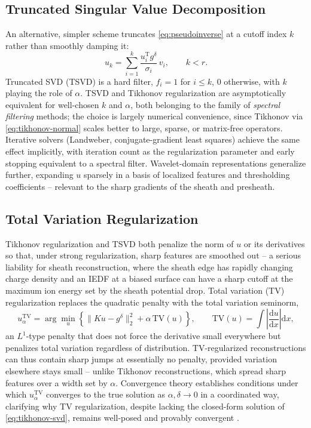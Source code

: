 \subsection{Truncated Singular Value Decomposition}

An alternative, simpler scheme truncates \cref{eq:pseudoinverse} at a cutoff index $k$ rather than smoothly damping it:
\begin{equation}
u_{k} = \sum_{i=1}^{k} \frac{u_{i}^{\mathrm{T}} g^{\delta}}{\sigma_{i}}\, v_{i}, \qquad k < r.
\label{eq:tsvd}
\end{equation}
Truncated SVD (TSVD) is a hard filter, $f_i = 1$ for $i \le k$, $0$ otherwise, with $k$ playing the role of $\alpha$. TSVD and Tikhonov regularization are asymptotically equivalent for well-chosen $k$ and $\alpha$, both belonging to the family of \emph{spectral filtering} methods; the choice is largely numerical convenience, since Tikhonov via \cref{eq:tikhonov-normal} scales better to large, sparse, or matrix-free operators. Iterative solvers (Landweber, conjugate-gradient least squares) achieve the same effect implicitly, with iteration count as the regularization parameter and early stopping equivalent to a spectral filter. Wavelet-domain representations generalize further, expanding $u$ sparsely in a basis of localized features and thresholding coefficients -- relevant to the sharp gradients of the sheath and presheath.

\subsection{Total Variation Regularization}

Tikhonov regularization and TSVD both penalize the norm of $u$ or its derivatives so that, under strong regularization, sharp features are smoothed out -- a serious liability for sheath reconstruction, where the sheath edge has rapidly changing charge density and an IEDF at a biased surface can have a sharp cutoff at the maximum ion energy set by the sheath potential drop. Total variation (TV) regularization replaces the quadratic penalty with the total variation seminorm,
\begin{equation}
u_{\alpha}^{\mathrm{TV}} = \arg\min_{u} \left\{ \| Ku - g^{\delta} \|_{2}^{2} + \alpha \, \mathrm{TV}(u) \right\}, \qquad \mathrm{TV}(u) = \int \left| \frac{\mathrm{d}u}{\mathrm{d}x} \right| \mathrm{d}x,
\label{eq:tv}
\end{equation}
an $L^1$-type penalty that does not force the derivative small everywhere but penalizes total variation regardless of distribution. TV-regularized reconstructions can thus contain sharp jumps at essentially no penalty, provided variation elsewhere stays small -- unlike Tikhonov reconstructions, which spread sharp features over a width set by $\alpha$. Convergence theory establishes conditions under which $u_{\alpha}^{\mathrm{TV}}$ converges to the true solution as $\alpha, \delta \to 0$ in a coordinated way, clarifying why TV regularization, despite lacking the closed-form solution of \cref{eq:tikhonov-svd}, remains well-posed and provably convergent \cite{ref0692}.

